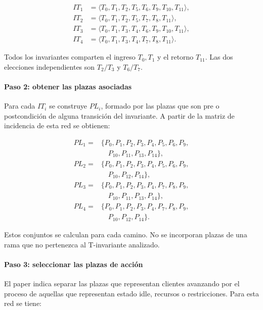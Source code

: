 \documentclass[11pt,a4paper]{article}
\begin{document}
\begin{align*}
    IT_1 &= \langle T_0,T_1,T_2,T_5,T_6,T_9,T_{10},T_{11}\rangle,\\
    IT_2 &= \langle T_0,T_1,T_2,T_5,T_7,T_8,T_{11}\rangle,\\
    IT_3 &= \langle T_0,T_1,T_3,T_4,T_6,T_9,T_{10},T_{11}\rangle,\\
    IT_4 &= \langle T_0,T_1,T_3,T_4,T_7,T_8,T_{11}\rangle.
\end{align*}

Todos los invariantes comparten el ingreso $T_0,T_1$ y el retorno $T_{11}$.
Las dos elecciones independientes son $T_2/T_3$ y $T_6/T_7$.

\paragraph{Paso 2: obtener las plazas asociadas}

Para cada $IT_i$ se construye $PL_i$, formado por las plazas que son pre o
postcondición de alguna transición del invariante. A partir de la matriz de
incidencia de esta red se obtienen:

\begin{align*}
    PL_1 ={}& \{P_0,P_1,P_2,P_3,P_4,P_5,P_6,P_9,\\
              &\quad P_{10},P_{11},P_{13},P_{14}\},\\[0.2em]
    PL_2 ={}& \{P_0,P_1,P_2,P_3,P_4,P_5,P_6,P_9,\\
              &\quad P_{10},P_{12},P_{14}\},\\[0.2em]
    PL_3 ={}& \{P_0,P_1,P_2,P_3,P_4,P_7,P_8,P_9,\\
              &\quad P_{10},P_{11},P_{13},P_{14}\},\\[0.2em]
    PL_4 ={}& \{P_0,P_1,P_2,P_3,P_4,P_7,P_8,P_9,\\
              &\quad P_{10},P_{12},P_{14}\}.
\end{align*}

Estos conjuntos se calculan para cada camino. No se incorporan plazas de una
rama que no pertenezca al T-invariante analizado.

\paragraph{Paso 3: seleccionar las plazas de acción}

El paper indica separar las plazas que representan clientes avanzando por el
proceso de aquellas que representan estado idle, recursos o restricciones. Para
esta red se tiene:
\end{document}

